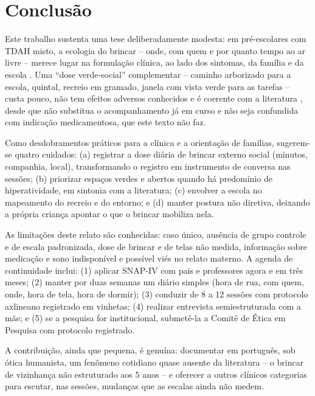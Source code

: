 \section{Conclus\~ao}

Este trabalho sustenta uma tese deliberadamente modesta: em pr\'e-escolares com TDAH misto, a ecologia do brincar -- onde, com quem e por quanto tempo ao ar livre -- merece lugar na formula\c{c}\~ao cl\'inica, ao lado dos sintomas, da fam\'ilia e da escola \cite{bronfenbrenner1996}. Uma ``dose verde-social'' complementar -- caminho arborizado para a escola, quintal, recreio em gramado, janela com vista verde para as tarefas -- custa pouco, n\~ao tem efeitos adversos conhecidos e \'e coerente com a literatura \cite{taylor2011,hood2024,fabertaylor2009}, desde que n\~ao substitua o acompanhamento j\'a em curso e n\~ao seja confundida com indica\c{c}\~ao medicamentosa, que este texto n\~ao faz.

Como desdobramentos pr\'aticos para a cl\'inica e a orienta\c{c}\~ao de fam\'ilias, sugerem-se quatro cuidados: (a) registrar a dose di\'aria de brincar externo social (minutos, companhia, local), transformando o registro em instrumento de conversa nas sess\~oes; (b) priorizar espa\c{c}os verdes e abertos quando h\'a predom\'inio de hiperatividade, em sintonia com a literatura; (c) envolver a escola no mapeamento do recreio e do entorno; e (d) manter postura n\~ao diretiva, deixando a pr\'opria crian\c{c}a apontar o que o brincar mobiliza nela.

As limita\c{c}\~oes deste relato s\~ao conhecidas: caso \'unico, aus\^encia de grupo controle e de escala padronizada, dose de brincar e de telas n\~ao medida, informa\c{c}\~ao sobre medica\c{c}\~ao e sono indispon\'ivel e poss\'ivel vi\'es no relato materno. A agenda de continuidade inclui: (1) aplicar SNAP-IV com pais e professores agora e em tr\^es meses; (2) manter por duas semanas um di\'ario simples (hora de rua, com quem, onde, hora de tela, hora de dormir); (3) conduzir de 8 a 12 sess\~oes com protocolo axlineano registrado em vinhetas; (4) realizar entrevista semiestruturada com a m\~ae; e (5) se a pesquisa for institucional, submet\^e-la a Comit\^e de \'Etica em Pesquisa com protocolo registrado.

A contribui\c{c}\~ao, ainda que pequena, \'e genu\'ina: documentar em portugu\^es, sob \'otica humanista, um fen\^omeno cotidiano quase ausente da literatura -- o brincar de vizinhan\c{c}a n\~ao estruturado aos 5 anos -- e oferecer a outros cl\'inicos categorias para escutar, nas sess\~oes, mudan\c{c}as que as escalas ainda n\~ao medem.
